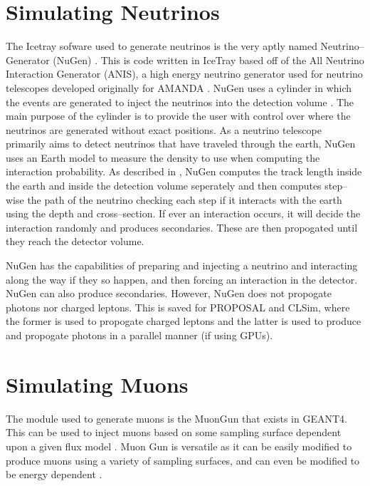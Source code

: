 \section{Simulating Neutrinos}

The Icetray sofware used to generate neutrinos is the very aptly named Neutrino--Generator (NuGen) \cite{icetray, icetray_art}. This is code written in IceTray based off of the All Neutrino Interaction Generator (ANIS), a high energy neutrino generator used for neutrino telescopes developed originally for AMANDA \cite{lepton_inj}. NuGen uses a cylinder in which the events are generated to inject the neutrinos into the detection volume \cite{sim_present}. The main purpose of the cylinder is to provide the user with control over where the neutrinos are generated without exact positions. As a neutrino telescope primarily aims to detect neutrinos that have traveled through the earth, NuGen uses an Earth model to measure the density to use when computing the interaction probability. As described in \cite{sim_present}, NuGen computes the track length inside the earth and inside the detection volume seperately and then computes step--wise the path of the neutrino checking each step if it interacts with the earth using the depth and cross--section. If ever an interaction occurs, it will decide the interaction randomly and produces secondaries. These are then propogated until they reach the detector volume.


NuGen has the capabilities of preparing and injecting a neutrino and interacting along the way if they so happen, and then forcing an interaction in the detector. NuGen can also produce secondaries. However, NuGen does not propogate photons nor charged leptons. This is saved for PROPOSAL and CLSim, where the former is used to propogate charged leptons and the latter is used to produce and propogate photons in a parallel manner (if using GPUs).

\section{Simulating Muons}

The module used to generate muons is the MuonGun that exists in GEANT4. This can be used to inject muons based on some sampling surface dependent upon a given flux model \cite{icetray}. Muon Gun is versatile as it can be easily modified to produce muons using a variety of sampling surfaces, and can even be modified to be energy dependent \cite{icetray}.

